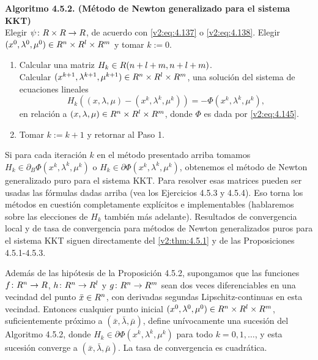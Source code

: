 \noindent \textbf{Algoritmo 4.5.2. (Método de Newton generalizado para el sistema KKT)} \\
Elegir $\psi \colon R \times R \to R$, de acuerdo con \eqref{v2:eq:4.137} o \eqref{v2:eq:4.138}. Elegir $(x^0, \lambda^0, \mu^0) \in R^n \times R^l \times R^m$ y tomar $k := 0$.
\begin{enumerate}
    \item Calcular una matriz $H_k \in R(n+l+m, n+l+m)$. \\
    Calcular $(x^{k+1}, \lambda^{k+1}, \mu^{k+1}) \in R^n \times R^l \times R^m$, una solución del sistema de ecuaciones lineales
    \[
        H_k((x, \lambda, \mu) - (x^k, \lambda^k, \mu^k)) = -\Phi(x^k, \lambda^k, \mu^k),
    \]
    en relación a $(x, \lambda, \mu) \in R^n \times R^l \times R^m$, donde $\Phi$ es dada por \eqref{v2:eq:4.145}.
    \item Tomar $k := k + 1$ y retornar al Paso 1.
\end{enumerate}

Si para cada iteración $k$ en el método presentado arriba tomamos $H_k \in \partial_B \Phi(x^k, \lambda^k, \mu^k)$ o $H_k \in \partial \Phi(x^k, \lambda^k, \mu^k)$, obtenemos el método de Newton generalizado puro para el sistema KKT. Para resolver esas matrices pueden ser usadas las fórmulas dadas arriba (vea los Ejercicios 4.5.3 y 4.5.4). Eso torna los métodos en cuestión completamente explícitos e implementables (hablaremos sobre las elecciones de $H_k$ también más adelante). Resultados de convergencia local y de tasa de convergencia para métodos de Newton generalizados puros para el sistema KKT siguen directamente del \cref{v2:thm:4.5.1} y de las Proposiciones 4.5.1-4.5.3.

\begin{theorem}\label{v2:thm:4.5.2}
    Además de las hipótesis de la Proposición 4.5.2, supongamos que las funciones $f \colon R^n \to R$, $h \colon R^n \to R^l$ y $g \colon R^n \to R^m$ sean dos veces diferenciables en una vecindad del punto $\bar{x} \in R^n$, con derivadas segundas Lipschitz-continuas en esta vecindad.
    Entonces cualquier punto inicial $(x^0, \lambda^0, \mu^0) \in R^n \times R^l \times R^m$, suficientemente próximo a $(\bar{x}, \bar{\lambda}, \bar{\mu})$, define unívocamente una sucesión del Algoritmo 4.5.2, donde $H_k \in \partial \Phi(x^k, \lambda^k, \mu^k)$ para todo $k = 0, 1, \dots$, y esta sucesión converge a $(\bar{x}, \bar{\lambda}, \bar{\mu})$. La tasa de convergencia es cuadrática.
\end{theorem}

